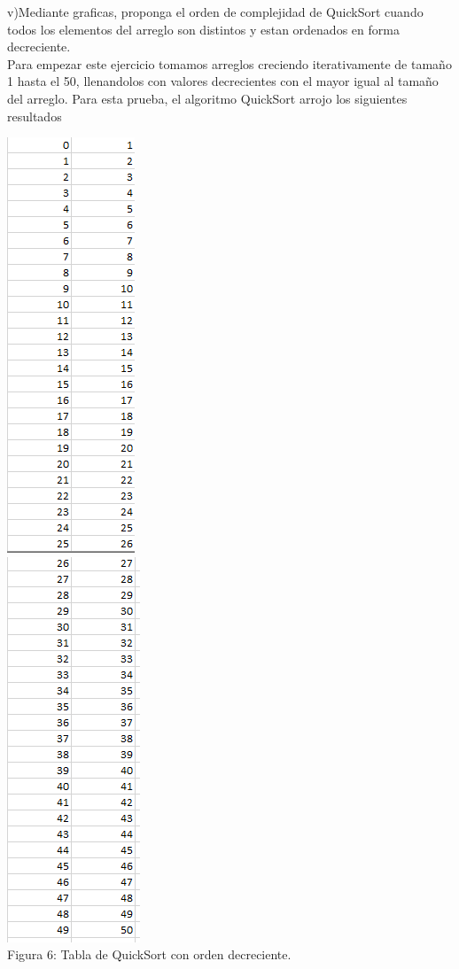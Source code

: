 \documentclass[spanish]{article}
\begin{document}
	\bigskip
\newpage
	{\large  v)Mediante graficas, proponga el orden de complejidad de QuickSort cuando todos los elementos del arreglo son distintos y estan ordenados en forma decreciente. }\\
\bigskip
	Para empezar este ejercicio tomamos arreglos creciendo iterativamente de tamaño 1 hasta el 50, llenandolos con valores 			decrecientes con el mayor igual al tamaño del arreglo.
	Para esta prueba, el algoritmo QuickSort arrojo los siguientes resultados
 \begin{center}
	\includegraphics[scale=.5]{./imagenes/tqsDesc/1.png}\\
	\includegraphics[scale=.5]{./imagenes/tqsDesc/2.png}\\
		Figura 6: Tabla de QuickSort con orden decreciente.
	\end{center}
\end{document}

